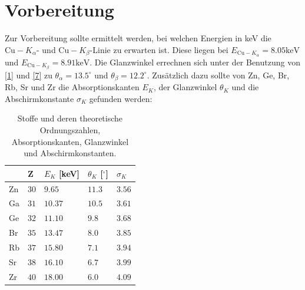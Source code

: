 \section{Vorbereitung}
Zur Vorbereitung sollte ermittelt werden, bei welchen Energien in keV die $\textrm{Cu}-K_{\alpha}$- und $\textrm{Cu}-K_{\beta}$-Linie zu erwarten ist. Diese liegen bei $E_{\textrm{Cu}-K_{\alpha}}=8.05 \si{\keV}$ und $E_{\textrm{Cu}-K_{\beta}}=8.91 \si{\keV}$. Die Glanzwinkel errechnen sich unter der Benutzung von \eqref{1} und \eqref{7} zu $\theta_{\alpha}=13.5^\circ$ und $\theta_{\beta}=12.2^\circ$.
Zusätzlich dazu sollte von Zn, Ge, Br, Rb, Sr und Zr die Absorptionskanten $E_{K}$, der Glanzwinkel $\theta_{K}$ und die Abschirmkonstante $\sigma_{K}$ gefunden werden:
\begin{table}[H]
  \centering
  \begin{tabular}{l|l|l|l|l}
  & Z & $E_{K}$ [keV] & $\theta_{K}$ [$^{\circ}$] & $\sigma_{K}$ \\\hline
  Zn & $30$ & $9.65$ & $11.3$ & $3.56$\\\hline
  Ga & $31$ & $10.37$ & $10.5$ & $3.61$\\\hline
  Ge & $32$ & $11.10$ & $9.8$ & $3.68$\\\hline
  Br & $35$ & $13.47$ & $8.0$ & $3.85$\\\hline
  Rb & $37$ & $15.80$ & $7.1$ & $3.94$\\\hline
  Sr & $38$ & $16.10$ & $6.7$ & $3.99$\\\hline
  Zr & $40$ & $18.00$ & $6.0$ & $4.09$\\\hline
  \end{tabular}
  \caption{Stoffe und deren theoretische Ordnungszahlen, Absorptionskanten, Glanzwinkel und Abschirmkonstanten.}
  \label{tab:1}
\end{table}
